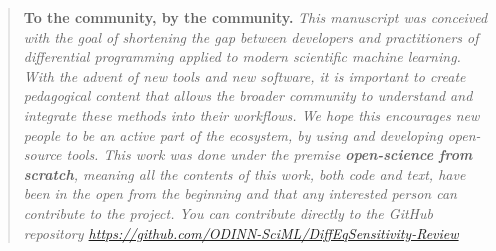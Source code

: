 
\begin{quote}
    \textbf{To the community, by the community.}
    \textit{This manuscript was conceived with the goal of shortening the gap between developers and practitioners of differential programming applied to  modern scientific machine learning. 
    With the advent of new tools and new software, it is important to create pedagogical content that allows the broader community to understand and integrate these methods into their workflows. 
    We hope this encourages new people to be an active part of the ecosystem, by using and developing open-source tools. 
    This work was done under the premise \textbf{open-science from scratch}, meaning all the contents of this work, both code and text, have been in the open from the beginning and that any interested person can contribute to the project. 
    You can contribute directly to the GitHub repository \url{https://github.com/ODINN-SciML/DiffEqSensitivity-Review}
    }
\end{quote}